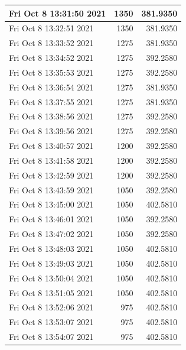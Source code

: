 \begin{longtable}{|l|r|r|}
Fri Oct  8 13:31:50 2021 &               1350 &        381.9350 \\ \hline
Fri Oct  8 13:32:51 2021 &               1350 &        381.9350 \\ \hline
Fri Oct  8 13:33:52 2021 &               1275 &        381.9350 \\ \hline
Fri Oct  8 13:34:52 2021 &               1275 &        392.2580 \\ \hline
Fri Oct  8 13:35:53 2021 &               1275 &        392.2580 \\ \hline
Fri Oct  8 13:36:54 2021 &               1275 &        381.9350 \\ \hline
Fri Oct  8 13:37:55 2021 &               1275 &        381.9350 \\ \hline
Fri Oct  8 13:38:56 2021 &               1275 &        392.2580 \\ \hline
Fri Oct  8 13:39:56 2021 &               1275 &        392.2580 \\ \hline
Fri Oct  8 13:40:57 2021 &               1200 &        392.2580 \\ \hline
Fri Oct  8 13:41:58 2021 &               1200 &        392.2580 \\ \hline
Fri Oct  8 13:42:59 2021 &               1200 &        392.2580 \\ \hline
Fri Oct  8 13:43:59 2021 &               1050 &        392.2580 \\ \hline
Fri Oct  8 13:45:00 2021 &               1050 &        402.5810 \\ \hline
Fri Oct  8 13:46:01 2021 &               1050 &        392.2580 \\ \hline
Fri Oct  8 13:47:02 2021 &               1050 &        392.2580 \\ \hline
Fri Oct  8 13:48:03 2021 &               1050 &        402.5810 \\ \hline
Fri Oct  8 13:49:03 2021 &               1050 &        402.5810 \\ \hline
Fri Oct  8 13:50:04 2021 &               1050 &        402.5810 \\ \hline
Fri Oct  8 13:51:05 2021 &               1050 &        402.5810 \\ \hline
Fri Oct  8 13:52:06 2021 &                975 &        402.5810 \\ \hline
Fri Oct  8 13:53:07 2021 &                975 &        402.5810 \\ \hline
Fri Oct  8 13:54:07 2021 &                975 &        402.5810 \\ \hline

\end{longtable}
